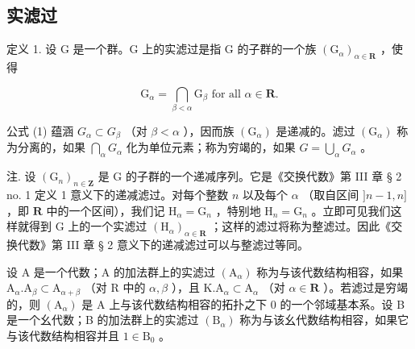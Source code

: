 \subsection{实滤过}

定义 1. 设 G 是一个群。G 上的实滤过是指 G 的子群的一个族 \((\mathrm{G}_{\alpha})_{\alpha \in \mathbf{R}}\) ，使得

\[
\mathrm{G} _ {\alpha} = \bigcap_ {\beta <   \alpha} \mathrm{G} _ {\beta} \text {   for   all   } \alpha \in \mathbf {R}.\tag{1}
\]

公式 (1) 蕴涵 \(G_{\alpha} \subset G_{\beta}\) （对 \(\beta < \alpha\) ），因而族 \((\mathrm{G}_{\alpha})\) 是递减的。滤过 \((\mathrm{G}_{\alpha})\) 称为分离的，如果 \(\bigcap_{\alpha} G_{\alpha}\) 化为单位元素；称为穷竭的，如果 \(G = \bigcup_{\alpha} G_{\alpha}\) 。

注. 设 \((\mathrm{G}_n)_{n\in \mathbf{Z}}\) 是 G 的子群的一个递减序列。它是《交换代数》第 III 章 § 2 no. 1 定义 1 意义下的递减滤过。对每个整数 \(n\) 以及每个 \(\alpha\) （取自区间 \(]n - 1,n]\) ，即 \(\mathbf{R}\) 中的一个区间），我们记 \(\mathrm{H}_{\alpha} = \mathrm{G}_{n}\) ，特别地 \(\mathrm{H}_n = \mathrm{G}_n\) 。立即可见我们这样就得到 G 上的一个实滤过 \((\mathrm{H}_{\alpha})_{\alpha \in \mathbf{R}}\) ；这样的滤过将称为整滤过。因此《交换代数》第 III 章 § 2 意义下的递减滤过可以与整滤过等同。

设 A 是一个代数；A 的加法群上的实滤过 \((\mathrm{A}_{\alpha})\) 称为与该代数结构相容，如果 \(\mathrm{A}_{\alpha}.\mathrm{A}_{\beta}\subset \mathrm{A}_{\alpha +\beta}\) （对 R 中的 \(\alpha ,\beta\) ），且 \(\mathrm{K.A}_{\alpha}\subset \mathrm{A}_{\alpha}\) （对 \(\alpha \in \mathbf{R}\) ）。若滤过是穷竭的，则 \((\mathrm{A}_{\alpha})\) 是 A 上与该代数结构相容的拓扑之下 0 的一个邻域基本系。设 B 是一个幺代数；B 的加法群上的实滤过 \((\mathrm{B}_{\alpha})\) 称为与该幺代数结构相容，如果它与该代数结构相容并且 \(1\in \mathrm{B}_0\) 。

